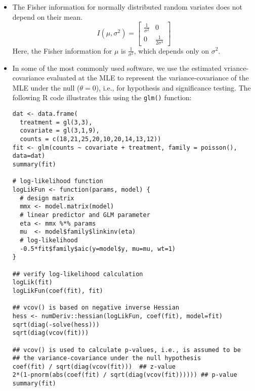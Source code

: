 \documentclass{article}
\begin{document}
\begin{itemize}
\item The Fisher information for normally distributed random variates does not depend on their mean.
\[I(\mu, \sigma^2) = 
\begin{bmatrix}
\frac{1}{\sigma^2} & 0 \\
0 & \frac{1}{2\sigma^4}
\end{bmatrix}
\]
Here, the Fisher information for $\mu$ is $\frac{1}{\sigma^2}$, which depends only on $\sigma^2$.
\item In some of the most commonly used software, we use the estimated vriance-covariance evaluated at the MLE to represent the variance-covariance of the MLE under the null ($\theta = 0$), i.e., for hypothesis and significance testing. The following R code illustrates this using the {\tt glm()} function:
{\small\begin{verbatim}
dat <- data.frame(
  treatment = gl(3,3), 
  covariate = gl(3,1,9), 
  counts = c(18,21,25,20,10,20,14,13,12)) 
fit <- glm(counts ~ covariate + treatment, family = poisson(), data=dat)
summary(fit)

# log-likelihood function
logLikFun <- function(params, model) {
  # design matrix
  mmx <- model.matrix(model)
  # linear predictor and GLM parameter
  eta <- mmx %*% params
  mu  <- model$family$linkinv(eta)
  # log-likelihood
  -0.5*fit$family$aic(y=model$y, mu=mu, wt=1)
}

## verify log-likelihood calculation
logLik(fit)
logLikFun(coef(fit), fit)

## vcov() is based on negative inverse Hessian
hess <- numDeriv::hessian(logLikFun, coef(fit), model=fit)
sqrt(diag(-solve(hess)))
sqrt(diag(vcov(fit)))

## vcov() is used to calculate p-values, i.e., is assumed to be
## the variance-covariance under the null hypothesis
coef(fit) / sqrt(diag(vcov(fit)))  ## z-value
2*(1-pnorm(abs(coef(fit) / sqrt(diag(vcov(fit)))))) ## p-value
summary(fit)
\end{verbatim}}

\end{itemize}
\end{document}
